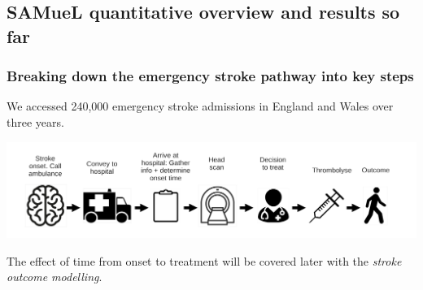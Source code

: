 \documentclass[xcolor={usenames,dvipsnames}]{beamer}
\begin{document}
\subsection{SAMueL quantitative overview and results so far} 

\begin{frame}
\frametitle{Breaking down the emergency stroke pathway into key steps}


We accessed 240,000 emergency stroke admissions in England and Wales over three years. %

\begin{center}
\includegraphics[width=1.0\textwidth]{./images/pathway}
\end{center}

The effect of time from onset to treatment will be covered later with the \emph{stroke outcome modelling}.

\end{frame}


\end{document}

